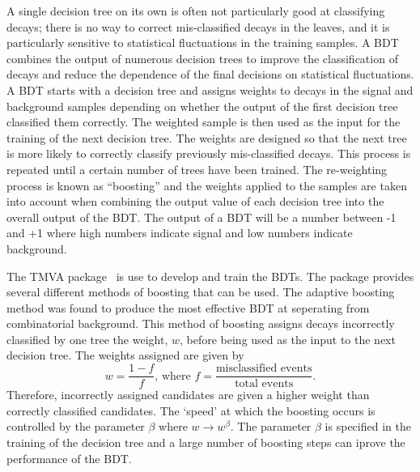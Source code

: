 A single decision tree on its own is often not particularly good at classifying decays; there is no way to correct mis-classified decays in the leaves, and it is particularly sensitive to statistical fluctuations in the training samples. A BDT combines the output of numerous decision trees to improve the classification of decays and reduce the dependence of the final decisions on statistical fluctuations. A BDT starts with a decision tree and assigns weights to decays in the signal and background samples depending on whether the output of the first decision tree classified them correctly. The weighted sample is then used as the input for the training of the next decision tree. The weights are designed so that the next tree is more likely to correctly classify previously mis-classified decays. This process is repeated until a certain number of trees have been trained. The re-weighting process is known as ``boosting'' and the weights applied to the samples are taken into account when combining the output value of each decision tree into the overall output of the BDT. The output of a BDT will be a number between -1 and +1 where high numbers indicate signal and low numbers indicate background.


The TMVA package~\cite{Hocker:2007ht} is use to develop and train the BDTs. The package provides several different methods of boosting that can be used. The adaptive boosting method was found to produce the most effective BDT at seperating \bmumu from combinatorial background.
This method of boosting assigns decays incorrectly classified by one tree the weight, $w$, before being used as the input to the next decision tree. The weights assigned are given by
\begin{equation}
w = \frac{1 - f}{f}\text{, where } f = \frac{\text{misclassified events}}{\text{total events}}.
\end{equation}
Therefore, incorrectly assigned candidates are given a higher weight than correctly classified candidates. The `speed’ at which the boosting occurs is controlled by the parameter $\beta$ where $w \rightarrow w^{\beta}$. The parameter $\beta$ is specified in the training of the decision tree and a large number of boosting steps can iprove the performance of the BDT.


